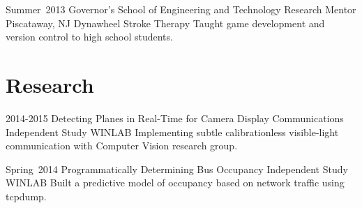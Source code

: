 \documentclass[11pt,letterpaper]{moderncv}
\begin{document}
    \cventry
        {Summer~2013}
        {Governor's School of Engineering and Technology}
        {Research Mentor}
        {Piscataway, NJ}
        {Dynawheel Stroke Therapy}
        {Taught game development and version control to high school students.}

\section{Research}
    \cventry
        {2014-2015}
        {Detecting Planes in Real-Time for Camera Display Communications}
        {\break Independent Study}
        {}
        {WINLAB}
        {Implementing subtle calibrationless visible-light communication with Computer Vision research group.\\}

    \cventry
        {Spring~2014}
        {Programmatically Determining Bus Occupancy}
        {Independent Study}
        {}
        {WINLAB}
        {Built a predictive model of occupancy based on network traffic using tcpdump.\\}


\end{document}
